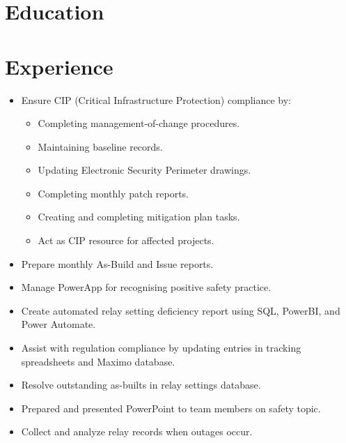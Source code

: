 \documentclass{lsanche_cv}
\begin{document}

\medskip


\smallskip


\begin{multicols}{2}
  \section{Education}

  \section{Experience}
    \begin{itemize}
			\item Ensure CIP (Critical Infrastructure Protection) compliance by:
            \begin{itemize}
              \item Completing management-of-change procedures.
              \item Maintaining baseline records.
              \item Updating Electronic Security Perimeter drawings.
              \item Completing monthly patch reports.
              \item Creating and completing mitigation plan tasks.
              \item Act as CIP resource for affected projects.
            \end{itemize}
			\item Prepare monthly As-Build and Issue reports.
			\item Manage PowerApp for recognising positive safety practice.
			\item Create automated relay setting deficiency report using SQL, PowerBI, and Power Automate.
    \end{itemize}

	\divider

    \begin{itemize}
			\item Assist with regulation compliance by updating entries in tracking spreadsheets and Maximo database.
			\item Resolve outstanding as-builts in relay settings database.
			\item Prepared and presented PowerPoint to team members on safety topic.
			\item Collect and analyze relay records when outages occur.
    \end{itemize}


\end{multicols}
\end{document}
